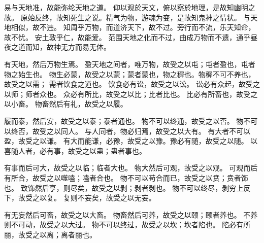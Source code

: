 {\fangsong 易与天地准，故能弥纶天地之道。
仰以观於天文，俯以察於地理，是故知幽明之故。
原始反终，故知死生之说。精气为物，游魂为变，是故知鬼神之情状。
与天地相似，故不违。
知周乎万物，而道济天下，故不过。旁行而不流，乐天知命，故不忧。
安土敦乎仁，故能爱。
范围天地之化而不过，曲成万物而不遗，通乎昼夜之道而知，故神无方而易无体。}

{\youyuan 有天地，然后万物生焉。
盈天地之间者，唯万物，故受之以屯；屯者盈也，屯者物之始生也。
物生必蒙，故受之以蒙；蒙者蒙也，物之穉也。物穉不可不养也，故受之以需；
需者饮食之道也。
饮食必有讼，故受之以讼。
讼必有众起，故受之以师；师者众也。
众必有所比，故受之以比；比者比也。
比必有所畜也，故受之以小畜。
物畜然后有礼，故受之以履。}

{\heiti 履而泰，然后安，故受之以泰；泰者通也。
物不可以终通，故受之以否。
物不可以终否，故受之以同人。
与人同者，物必归焉，故受之以大有。
有大者不可以盈，故受之以谦。
有大而能谦，必豫，故受之以豫。豫必有随，故受之以随。
以喜随人者，必有事，故受之以蛊；蛊者事也。}

{\lishu 有事而后可大，故受之以临；临者大也。
物大然后可观，故受之以观。
可观而后有所合，故受之以噬嗑；嗑者合也。
物不可以苟合而已，故受之以贲；贲者饰也。
致饰然后亨，则尽矣，故受之以剥；剥者剥也。
物不可以终尽，剥穷上反下，故受之以复。
复则不妄矣，故受之以无妄。}

{\songti 有无妄然后可畜，故受之以大畜。
物畜然后可养，故受之以颐；颐者养也。
不养则不可动，故受之以大过。
物不可以终过，故受之以坎；坎者陷也。
陷必有所丽，故受之以离；离者丽也。}

